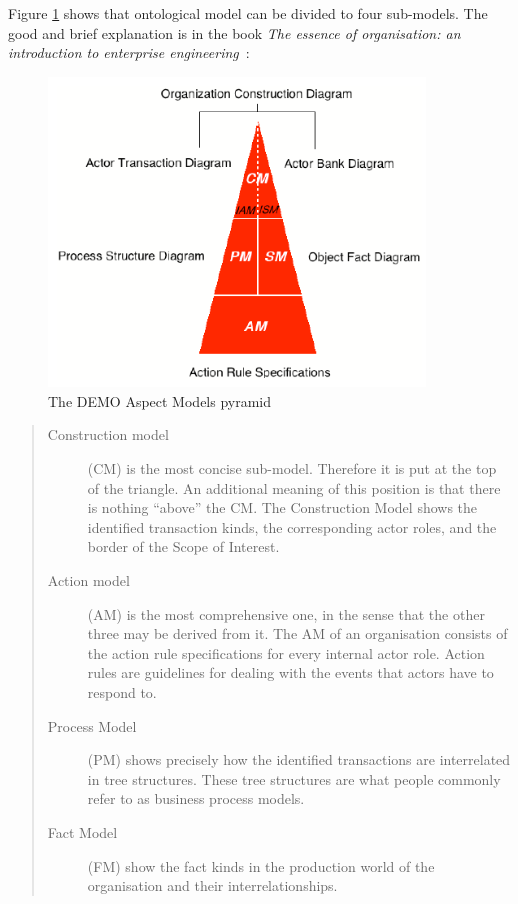 Figure \ref{fig:DemoAspectModels} shows that ontological model can be divided to four sub-models. The good and brief explanation is in the book \textit{The essence of organisation: an introduction to enterprise engineering}~\cite{perinforma-essence-2015}:

\begin{figure}[ht!]
	\centering
    \includegraphics[width=10cm, keepaspectratio]{img/DemoAspectModels}
    \caption{The DEMO Aspect Models pyramid}
    \label{fig:DemoAspectModels}
\end{figure}

\begin{quote}
	\begin{description}
		\item[Construction model] (CM) is the most concise sub-model. Therefore it is put at the top of the triangle. An additional meaning of this position is that there is nothing ``above'' the CM. The Construction Model shows the identified transaction kinds, the corresponding actor roles, and the border of the Scope of Interest.
         \item[Action model] (AM) is the most comprehensive one, in the sense that the other three may be derived from it. The AM of an organisation consists of the action rule specifications for every internal actor role. Action rules are guidelines for dealing with the events that actors have to respond to.
         
         \item[Process Model] (PM) shows precisely how the identified transactions are interrelated in tree structures. These tree structures are what people commonly refer to as business process models.
         
         \item[Fact Model] (FM) show the fact kinds in the production world of the organisation and their interrelationships. 
	\end{description}
\end{quote}

